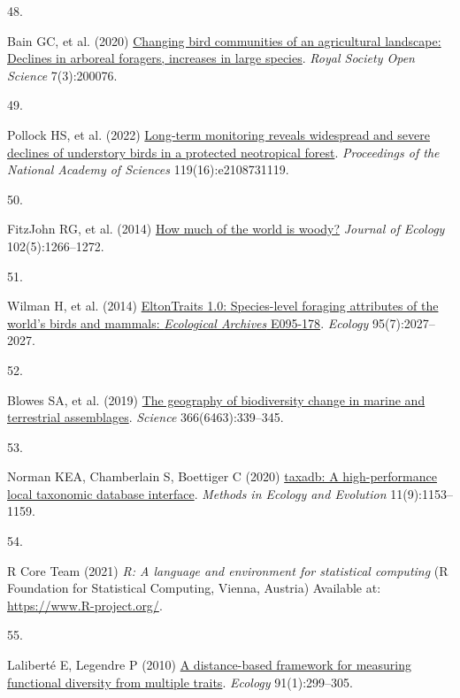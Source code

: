 \documentclass{article}
\newlength{\cslhangindent}
\newlength{\csllabelwidth}
\newlength{\cslentryspacingunit} %
\newenvironment{CSLReferences}[2] %
 {%
  \setlength{\parindent}{0pt}
  \ifodd #1
  \let\oldpar\par
  \def\par{\hangindent=\cslhangindent\oldpar}
  \fi
  \setlength{\parskip}{#2\cslentryspacingunit}
 }%
 {}
\newcommand{\CSLLeftMargin}[1]{\parbox[t]{\csllabelwidth}{#1}}
\newcommand{\CSLRightInline}[1]{\parbox[t]{\linewidth - \csllabelwidth}{#1}\break}
\begin{document}
\begin{CSLReferences}{0}{0}
\leavevmode{}%
\CSLLeftMargin{48. }%
\CSLRightInline{Bain GC, et al. (2020)
\href{https://doi.org/10.1098/rsos.200076}{Changing bird communities of
an agricultural landscape: Declines in arboreal foragers, increases in
large species}. \emph{Royal Society Open Science} 7(3):200076.}

\leavevmode{}%
\CSLLeftMargin{49. }%
\CSLRightInline{Pollock HS, et al. (2022)
\href{https://doi.org/10.1073/pnas.2108731119}{Long-term monitoring
reveals widespread and severe declines of understory birds in a
protected neotropical forest}. \emph{Proceedings of the National Academy
of Sciences} 119(16):e2108731119.}

\leavevmode{}%
\CSLLeftMargin{50. }%
\CSLRightInline{FitzJohn RG, et al. (2014)
\href{https://doi.org/10.1111/1365-2745.12260}{How much of the world is
woody?} \emph{Journal of Ecology} 102(5):1266--1272.}

\leavevmode{}%
\CSLLeftMargin{51. }%
\CSLRightInline{Wilman H, et al. (2014)
\href{https://doi.org/10.1890/13-1917.1}{EltonTraits 1.0: Species-level
foraging attributes of the world's birds and mammals: {\emph{Ecological
Archives}} E095-178}. \emph{Ecology} 95(7):2027--2027.}

\leavevmode{}%
\CSLLeftMargin{52. }%
\CSLRightInline{Blowes SA, et al. (2019)
\href{https://doi.org/10.1126/science.aaw1620}{The geography of
biodiversity change in marine and terrestrial assemblages}.
\emph{Science} 366(6463):339--345.}

\leavevmode{}%
\CSLLeftMargin{53. }%
\CSLRightInline{Norman KEA, Chamberlain S, Boettiger C (2020)
\href{https://doi.org/10.1111/2041-210X.13440}{taxadb: A
high-performance local taxonomic database interface}. \emph{Methods in
Ecology and Evolution} 11(9):1153--1159.}

\leavevmode{}%
\CSLLeftMargin{54. }%
\CSLRightInline{R Core Team (2021) \emph{R: A language and environment
for statistical computing} (R Foundation for Statistical Computing,
Vienna, Austria) Available at: \url{https://www.R-project.org/}.}

\leavevmode{}%
\CSLLeftMargin{55. }%
\CSLRightInline{Laliberté E, Legendre P (2010)
\href{https://doi.org/10.1890/08-2244.1}{A distance-based framework for
measuring functional diversity from multiple traits}. \emph{Ecology}
91(1):299--305.}


\end{CSLReferences}
\end{document}
